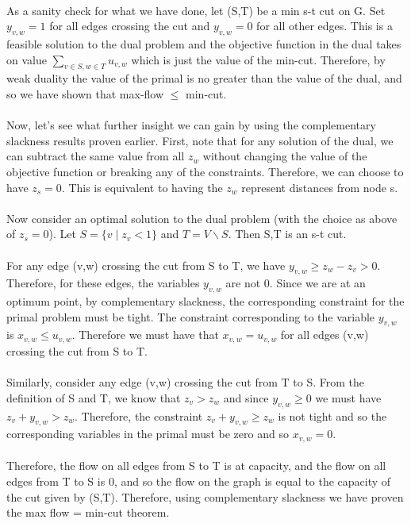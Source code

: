 \documentclass{article}
\begin{document}
\\
As a sanity check for what we have done, let (S,T) be a min s-t cut on G.  Set $y_{v,w} = 1$ for all edges crossing the cut and $y_{v,w} = 0$ for all other edges.  This is a feasible solution to the dual problem and the objective function in the dual takes on value $\sum_{v \in S, w \in T} u_{v,w}$ which is just the value of the min-cut.  Therefore, by weak duality the value of the primal is no greater than the value of the dual, and so we have shown that max-flow $\leq$ min-cut.\\
\\
Now, let's see what further insight we can gain by using the complementary slackness results proven earlier.  First, note that for any solution of the dual, we can subtract the same value from all $z_{w}$ without changing the value of the objective function or breaking any of the constraints.  Therefore, we can choose to have $z_s = 0$.  This is equivalent to having the $z_{w}$ represent distances from node s.\\
\\
Now consider an optimal solution to the dual problem (with the choice as above of $z_s = 0$).  Let $S = \{v \mid z_v < 1\}$ and $T = V  \smallsetminus S$.  Then {S,T} is an s-t cut.\\
\\
For any edge (v,w) crossing the cut from S to T, we have $y_{v,w} \geq z_w - z_v > 0$.  Therefore, for these edges, the variables $y_{v,w}$ are not 0.  Since we are at an optimum point, by complementary slackness, the corresponding constraint for the primal problem must be tight.  The constraint corresponding to the variable $y_{v,w}$ is $x_{v,w} \leq u_{v,w}$.  Therefore we must have that $x_{v,w} = u_{v,w}$ for all edges (v,w) crossing the cut from S to T.\\
\\
Similarly, consider any edge (v,w) crossing the cut from T to S.  From the definition of S and T, we know that $z_v > z_w$ and since $y_{v,w} \geq 0$ we must have $z_v + y_{v,w} > z_w$.  Therefore, the constraint $z_v + y_{v,w} \geq z_w$ is not tight and so the corresponding variables in the primal must be zero and so $ x_{v,w} = 0$.\\
\\
Therefore, the flow on all edges from S to T is at capacity, and the flow on all edges from T to S is 0, and so the flow on the graph is equal to the capacity of the cut given by (S,T).  Therefore, using complementary slackness we have proven the max flow = min-cut theorem.\\
\end{document}
